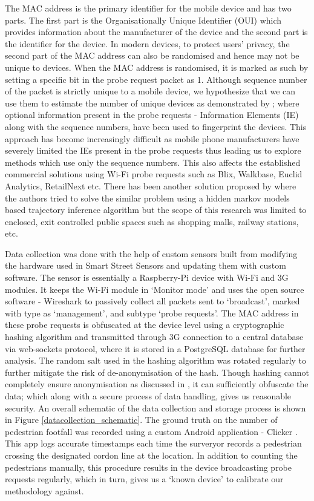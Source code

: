 The MAC address is the primary identifier for the mobile device and has two
parts. The first part is the Organisationally Unique Identifier (OUI) which
provides information about the manufacturer of the device and the second part is
the identifier for the device. In modern devices, to protect users' privacy, the
second part of the MAC address can also be randomised and hence may not be
unique to devices. When the MAC address is randomised, it is marked as such by
setting a specific bit in the probe request packet as 1. Although sequence
number of the packet is strictly unique to a mobile device, we hypothesize that
we can use them to estimate the number of unique devices as demonstrated by
\citep{vanhoef2016}; where optional information present in the probe requests -
Information Elements (IE) along with the sequence numbers, have been used to
fingerprint the devices. This approach has become increasingly difficult as
mobile phone manufacturers have severely limited the IEs present in the probe
requests thus leading us to explore methods which use only the sequence numbers.
This also affects the established commercial solutions using Wi-Fi probe
requests such as Blix, Walkbase, Euclid Analytics, RetailNext etc.  There has
been another solution proposed by \citep{hong2018crowdprobe} where the authors
tried to solve the similar problem using a hidden markov models based trajectory
inference algorithm but the scope of this research was limited to enclosed, exit
controlled public spaces such as shopping malls, railway stations, etc.

Data collection was done with the help of custom sensors built from modifying
the hardware used in Smart Street Sensors \citep{sss2016} and updating them with
custom software. The sensor is essentially a Raspberry-Pi device with Wi-Fi and
3G modules. It keeps the Wi-Fi module in `Monitor mode' and uses the open source
software - Wireshark \citep{wireshark2} to passively collect all packets sent to
`broadcast', marked with type as `management', and subtype `probe requests'.
The MAC address in these probe requests is obfuscated at the device level using
a cryptographic hashing algorithm and transmitted through 3G connection to a
central database via web-sockets protocol, where it is stored in a PostgreSQL
database for further analysis. The random salt used in the hashing algorithm was
rotated regularly to further mitigate the risk of de-anonymisation of the hash.
Though hashing cannot completely ensure anonymisation as discussed in
\citep{demir2014analysing}, it can sufficiently obfuscate the data; which along
with a secure process of data handling, gives us reasonable security. An overall
schematic of the data collection and storage process is shown in Figure
\ref{datacollection_schematic}. The ground truth on the number of pedestrian
footfall was recorded using a custom Android application - Clicker
\citep{bala2018clicker}. This app logs accurate timestamps each time the
surveryor records a pedestrian crossing the designated cordon line at the
location. In addition to counting the pedestrians manually, this procedure
results in the device broadcasting probe requests regularly, which in turn,
gives us a `known device' to calibrate our methodology against.

